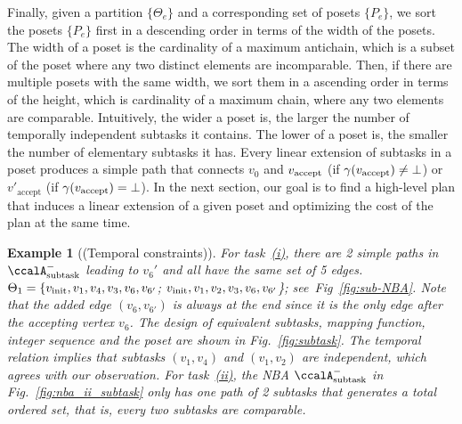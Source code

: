 \documentclass[Afour,sageh,times]{sagej}
\newtheorem{exmp}{Example}
\newcommand{\auto}[1]{\ccalA_{\textup{#1}}}
\newcommand{\vertex}[1]{v_{\textup{#1}}}
\newenvironment{cexmp}
{\addtocounter{exmp}{-1}\begin{exmp}}
  {\end{exmp}}
\begin{document}
{Finally, given a partition $\{\Theta_e\}$ and a corresponding set of posets $\{P_e\}$, we sort the posets  $\{P_e\}$ first in a descending order in terms of the width of the posets. The width of a poset  is the cardinality of a maximum antichain, which is a subset of the poset where any two distinct elements are incomparable. Then, if there are multiple posets with the same width, we sort them in a ascending order in terms of the height, which is cardinality of a maximum chain, where any two elements are comparable. Intuitively, the wider a poset is, the larger the number of temporally independent subtasks it contains. The lower of a poset is, the smaller the number of elementary subtasks it has.} Every linear extension of subtasks in a poset produces a simple path that connects $v_0$ and $\vertex{accept}$ (if $\gamma(\vertex{accept}) \neq \bot$) or $v'_{\text{accept}}$ (if $\gamma(\vertex{accept}) = \bot$). In the next section, our goal is to find a high-level plan that induces a linear extension of a given poset and optimizing the cost of the plan at the same time.

\begin{cexmp}[(Temporal constraints)]
  For task~\hyperref[task:i]{\it (i)}, there are 2 simple paths in $\auto{subtask}^-$ leading to $v_6'$ and all have the same set of 5 edges.  $\Theta_1 = \{\vertex{init},v_1, v_4,v_3,v_6,v_{6'}$; $\vertex{init}, v_1, v_2,v_3, v_6, v_{6'}$\}; see~Fig~\ref{fig:sub-NBA}. Note that the added edge $(v_6, v_{6'})$ is always at the end since it is the only edge after the accepting vertex $v_6$. The design of equivalent subtasks, mapping function, integer sequence and the poset are shown in Fig.~\ref{fig:subtask}. The temporal relation implies that subtasks $(v_1, v_4)$ and $(v_1, v_2)$ are independent, which agrees with our observation. For task~\hyperref[task:ii]{\it (ii)}, the NBA $\auto{subtask}^-$ in Fig.~\ref{fig:nba_ii_subtask} only has one path of 2 subtasks that generates a total ordered set, that is, every two subtasks are comparable.
\end{cexmp}

\end{document}
